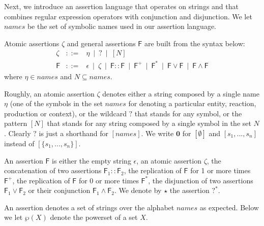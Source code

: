 Next, we introduce an assertion language that operates on strings
and that combines regular expression operators with conjunction and disjunction.
We let $\mathit{names}$ be the set of symbolic names used in our assertion language.

\begin{definition}
\label{def:assetionl}
Atomic assertions $\zeta$ and general assertions $\mathsf{F}$ are built from the syntax below: 
$$
\begin{array}{lcl}
\zeta & ::= & 
\eta ~\mid ~ 
? ~\mid ~ 
[N]
\\
\mathsf{F} & ::= & 
\epsilon ~\mid ~ 
\zeta ~\mid ~ 
\mathsf{F}::\mathsf{F} ~\mid ~ 
\mathsf{F}^+ ~\mid ~ 
\mathsf{F}^* ~\mid ~ 
\mathsf{F} \vee \mathsf{F} ~\mid ~ 
\mathsf{F} \wedge \mathsf{F}
\end{array}
$$
where $\eta \in \mathit{names}$ and $N\subseteq \mathit{names}$.
\end{definition}

Roughly, an atomic assertion $\zeta$ denotes either a string composed by a single name $\eta$ (one of the symbols in the set $\mathit{names}$ for denoting a particular entity, reaction, production or context), or
the wildcard $?$ that stands for any symbol, or the pattern $[N]$ that stands for any string composed by a single symbol in the set $N$. Clearly $?$  is just a shorthand for $[\mathit{names}]$.
We write $\mathbf{0}$ for $[\emptyset]$ and $[s_1,...,s_n]$ instead of $[\{s_1,...,s_n\}]$. 

An assertion $\mathsf{F}$ is either the empty string $\epsilon$, an atomic assertion $\zeta$, the concatenation of two assertions $\mathsf{F}_1::\mathsf{F}_2$, the replication of $\mathsf{F}$ for 1 or more times $\mathsf{F}^+$, the replication of $\mathsf{F}$ for 0 or more times $\mathsf{F}^*$, the disjunction of two assertions $\mathsf{F}_1 \vee \mathsf{F}_2$ or their conjunction $\mathsf{F}_1 \wedge \mathsf{F}_2$. We denote by $\star$ the assertion $?^*$.

An assertion denotes a set of strings over the alphabet $\mathit{names}$ as expected.
Below we let $\wp(X)$ denote the powerset of a set $X$.

